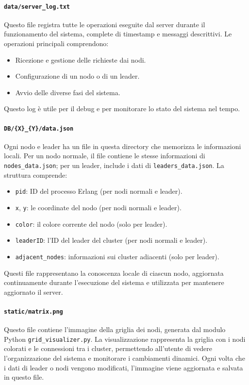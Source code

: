 \documentclass[12pt, a4paper]{report}
\begin{document}
\paragraph{\texttt{data/server\_log.txt}} Questo file registra tutte le operazioni eseguite dal server durante il funzionamento del sistema, complete di timestamp e messaggi descrittivi. Le operazioni principali comprendono:
\begin{itemize}
    \item Ricezione e gestione delle richieste dai nodi.
    \item Configurazione di un nodo o di un leader.
    \item Avvio delle diverse fasi del sistema.
\end{itemize}
Questo log è utile per il debug e per monitorare lo stato del sistema nel tempo.

\paragraph{\texttt{DB/\{X\}\_\{Y\}/data.json}} Ogni nodo e leader ha un file in questa directory che memorizza le informazioni locali. Per un nodo normale, il file contiene le stesse informazioni di \texttt{nodes\_data.json}; per un leader, include i dati di \texttt{leaders\_data.json}. La struttura comprende:
\begin{itemize}
    \item \texttt{pid}: ID del processo Erlang (per nodi normali e leader).
    \item \texttt{x}, \texttt{y}: le coordinate del nodo (per nodi normali e leader).
    \item \texttt{color}: il colore corrente del nodo (solo per leader).
    \item \texttt{leaderID}: l'ID del leader del cluster (per nodi normali e leader).
    \item \texttt{adjacent\_nodes}: informazioni sui cluster adiacenti (solo per leader).
\end{itemize}
Questi file rappresentano la conoscenza locale di ciascun nodo, aggiornata continuamente durante l’esecuzione del sistema e utilizzata per mantenere aggiornato il server.

\paragraph{\texttt{static/matrix.png}} Questo file contiene l'immagine della griglia dei nodi, generata dal modulo Python \texttt{grid\_visualizer.py}. La visualizzazione rappresenta la griglia con i nodi colorati e le connessioni tra i cluster, permettendo all'utente di vedere l'organizzazione del sistema e monitorare i cambiamenti dinamici. Ogni volta che i dati di leader o nodi vengono modificati, l'immagine viene aggiornata e salvata in questo file.
\end{document}
